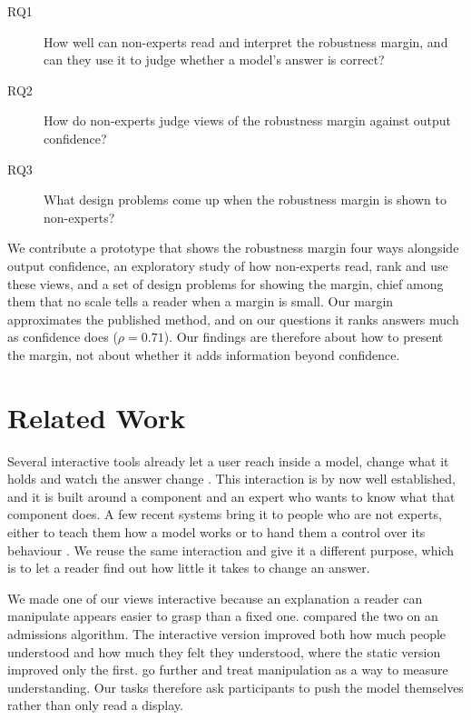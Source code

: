 \documentclass[sigconf]{acmart}
\begin{document}
\begin{description}
  \item[RQ1] How well can non-experts read and interpret the robustness margin, and can they use it to judge
    whether a model's answer is correct?
  \item[RQ2] How do non-experts judge views of the robustness margin against output confidence?
  \item[RQ3] What design problems come up when the robustness margin is shown to non-experts?
\end{description}

We contribute a prototype that shows the robustness margin four ways alongside output confidence, an exploratory
study of how non-experts read, rank and use these views, and a set of design problems for showing the margin,
chief among them that no scale tells a reader when a margin is small. Our margin approximates the published
method, and on our questions it ranks answers much as confidence does ($\rho = 0.71$). Our findings are
therefore about how to present the margin, not about whether it adds information beyond confidence.

\section{Related Work}

Several interactive tools already let a user reach inside a model, change what it holds and watch the answer
change \cite{strobeltSeq2SeqVisVisualDebugging2018, gevaLMDebuggerInteractiveTool2022,
wangHypperSteerHypotheticalSteering2020}. This interaction is by now well established, and it is built around
a component and an expert who wants to know what that component does. A few recent systems bring it to people
who are not experts, either to teach them how a model works or to hand them a control over its behaviour
\cite{choTransformerExplainerLearning2024, boSteerableChatbotsExploring2025}. We reuse the same interaction
and give it a different purpose, which is to let a reader find out how little it takes to change an answer.

We made one of our views interactive because an explanation a reader can manipulate appears easier to grasp
than a fixed one. \citet{chengExplainingDecisionMakingAlgorithms2019} compared the two on an admissions
algorithm. The interactive version improved both how much people understood and how much they felt they
understood, where the static version improved only the first.
\citet{rossEvaluatingInterpretabilityGenerative2021a} go further and treat manipulation as a way to measure
understanding. Our tasks therefore ask participants to push the model themselves rather than only read a
display.
\end{document}
